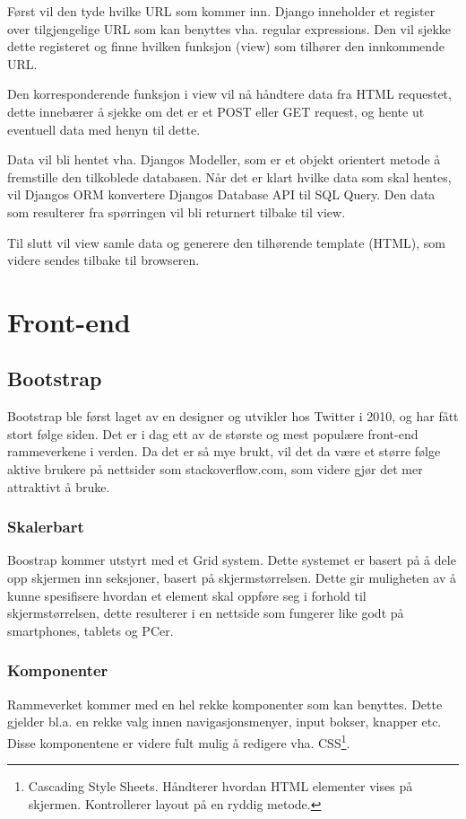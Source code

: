 Først vil den tyde hvilke URL som kommer inn. Django inneholder et register over tilgjengelige URL som kan benyttes vha. regular expressions. Den vil sjekke dette registeret og finne hvilken funksjon (view) som tilhører den innkommende URL.

Den korresponderende funksjon i view vil nå håndtere data fra HTML requestet, dette innebærer å sjekke om det er et POST eller GET request, og hente ut eventuell data med henyn til dette. 

Data vil bli hentet vha. Djangos Modeller, som er et objekt orientert metode å fremstille den tilkoblede databasen. Når det er klart hvilke data som skal hentes, vil Djangos ORM konvertere Djangos Database API til SQL Query. Den data som resulterer fra spørringen vil bli returnert tilbake til view.

Til slutt vil view samle data og generere den tilhørende template (HTML), som videre sendes tilbake til browseren.



\section{Front-end}
\subsection{Bootstrap}
Bootstrap ble først laget av en designer og utvikler hos Twitter i 2010, og har fått stort følge siden. Det er i dag ett av de største og mest populære front-end rammeverkene i verden. Da det er så mye brukt, vil det da være et større følge aktive brukere på nettsider som stackoverflow.com, som videre gjør det mer attraktivt å bruke.

\subsubsection*{Skalerbart}
Boostrap kommer utstyrt med et Grid system. Dette systemet er basert på å dele opp skjermen inn seksjoner, basert på skjermstørrelsen. Dette gir muligheten av å kunne spesifisere hvordan et element skal oppføre seg i forhold til skjermstørrelsen, dette resulterer i en nettside som fungerer like godt på smartphones, tablets og PCer.

\subsubsection*{Komponenter}
Rammeverket kommer med en hel rekke komponenter som kan benyttes.  Dette gjelder bl.a. en rekke valg innen navigasjonsmenyer, input bokser, knapper etc. Disse komponentene er videre fult mulig å redigere vha. CSS\footnote{Cascading Style Sheets. Håndterer hvordan HTML elementer vises på skjermen. Kontrollerer layout på en ryddig metode.}.


